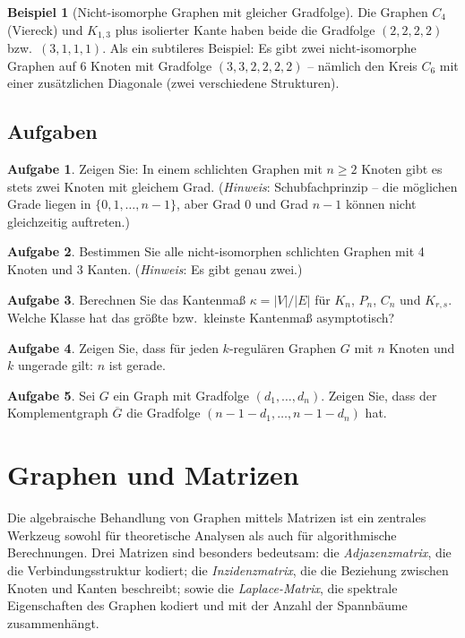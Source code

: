 ﻿\documentclass[a4paper,12pt,openany,oneside]{book}
\theoremstyle{definition}
\newtheorem{beispiel}{Beispiel}[chapter]
\newtheorem{aufgabe}{Aufgabe}[chapter]
\theoremstyle{plain}
\theoremstyle{remark}
\begin{document}
\begin{beispiel}[Nicht-isomorphe Graphen mit gleicher Gradfolge]
  Die Graphen $C_4$ (Viereck) und $K_{1,3}$ plus isolierter Kante haben
  beide die Gradfolge $(2,2,2,2)$ bzw.\ $(3,1,1,1)$. Als ein subtileres
  Beispiel: Es gibt zwei nicht-isomorphe Graphen auf 6 Knoten mit Gradfolge
  $(3,3,2,2,2,2)$ -- n\"amlich den Kreis $C_6$ mit einer zus\"atzlichen
  Diagonale (zwei verschiedene Strukturen).
\end{beispiel}

\section{Aufgaben}

\begin{aufgabe}
  Zeigen Sie: In einem schlichten Graphen mit $n \geq 2$ Knoten gibt es
  stets zwei Knoten mit gleichem Grad.
  (\emph{Hinweis}: Schubfachprinzip -- die m\"oglichen Grade liegen in
  $\{0, 1, \ldots, n-1\}$, aber Grad $0$ und Grad $n-1$ k\"onnen nicht
  gleichzeitig auftreten.)
\end{aufgabe}

\begin{aufgabe}
  Bestimmen Sie alle nicht-isomorphen schlichten Graphen mit 4 Knoten und
  3 Kanten. (\emph{Hinweis}: Es gibt genau zwei.)
\end{aufgabe}

\begin{aufgabe}
  Berechnen Sie das Kantenma\ss{} $\kappa = |V|/|E|$ f\"ur $K_n$, $P_n$,
  $C_n$ und $K_{r,s}$. Welche Klasse hat das gr\"o\ss{}te bzw.\ kleinste
  Kantenma\ss{} asymptotisch?
\end{aufgabe}

\begin{aufgabe}
  Zeigen Sie, dass f\"ur jeden $k$-regul\"aren Graphen $G$ mit $n$ Knoten
  und $k$ ungerade gilt: $n$ ist gerade.
\end{aufgabe}

\begin{aufgabe}
  Sei $G$ ein Graph mit Gradfolge $(d_1, \ldots, d_n)$. Zeigen Sie, dass
  der Komplementgraph $\overline{G}$ die Gradfolge
  $(n-1-d_1, \ldots, n-1-d_n)$ hat.
\end{aufgabe}
\chapter{Graphen und Matrizen}
\label{chap:matrizen}

Die algebraische Behandlung von Graphen mittels Matrizen ist ein zentrales
Werkzeug sowohl f\"ur theoretische Analysen als auch f\"ur algorithmische
Berechnungen. Drei Matrizen sind besonders bedeutsam: die
\emph{Adjazenzmatrix}, die die Verbindungsstruktur kodiert; die
\emph{Inzidenzmatrix}, die die Beziehung zwischen Knoten und Kanten
beschreibt; sowie die \emph{Laplace-Matrix}, die spektrale Eigenschaften
des Graphen kodiert und mit der Anzahl der Spannb\"aume zusammenh\"angt.
\end{document}
